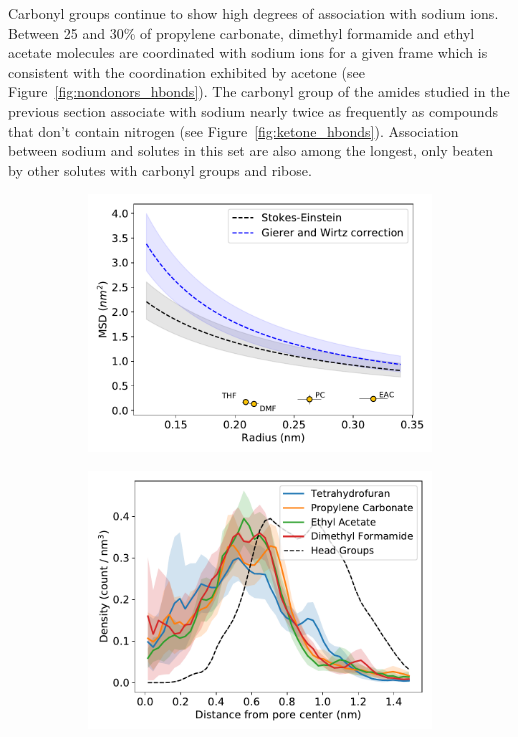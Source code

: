 \documentclass[journal=jpcbfk,manuscript=article]{achemso}
\begin{document}
  Carbonyl groups continue to show high degrees of association with
  sodium ions. Between 25 and 30\% of propylene carbonate, dimethyl 
  formamide and ethyl acetate molecules are coordinated with sodium ions
  for a given frame which is consistent with the coordination exhibited by acetone
  (see Figure~\ref{fig:nondonors_hbonds}). The carbonyl group of the amides 
  studied in the previous section associate with sodium nearly twice as 
  frequently as compounds that don't contain nitrogen 
  (see Figure~\ref{fig:ketone_hbonds}).
  Association between sodium and solutes in this set are also among the longest,
  only beaten by other solutes with carbonyl groups and ribose.
 
  \begin{figure}[!htb]
  \centering
  \begin{subfigure}{0.325\textwidth}
  \includegraphics[width=\textwidth]{msd_radius_nondonors_10wt.pdf}
  \caption{}\label{fig:nondonors_rdf}
  \end{subfigure}
  \begin{subfigure}{0.325\textwidth}
  \includegraphics[width=\textwidth]{nondonors_rdf.pdf}

\end{subfigure}
\end{figure}
\end{document}
